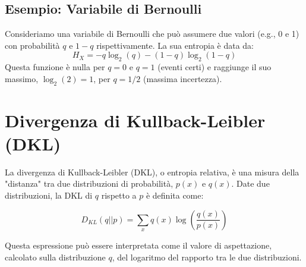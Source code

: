 \subsection*{Esempio: Variabile di Bernoulli}
Consideriamo una variabile di Bernoulli che può assumere due valori (e.g., 0 e 1) con probabilità $q$ e $1-q$ rispettivamente. La sua entropia è data da:
\begin{equation}
 H_X = -q \log_2(q) - (1-q) \log_2(1-q)
\end{equation}
Questa funzione è nulla per $q=0$ e $q=1$ (eventi certi) e raggiunge il suo massimo, $\log_2(2)=1$, per $q=1/2$ (massima incertezza).

\newpage
\section{Divergenza di Kullback-Leibler (DKL)}

La divergenza di Kullback-Leibler (DKL), o entropia relativa, è una misura della "distanza" tra due distribuzioni di probabilità, $p(x)$ e $q(x)$. Date due distribuzioni, la DKL di $q$ rispetto a $p$ è definita come:

\begin{tcolorbox}[colback=yellow!30,  
                  colframe=yellow!50!orange,  
                  boxrule=0.8pt, 
                  arc=3pt,  
                  top=4pt, bottom=4pt, left=6pt, right=6pt,
                  enhanced,
                  sharp corners=south]
\begin{equation}
 D_{KL}(q || p) = \sum_x q(x) \log\left(\frac{q(x)}{p(x)}\right)
\end{equation}
\end{tcolorbox}


Questa espressione può essere interpretata come il valore di aspettazione, calcolato sulla distribuzione $q$, del logaritmo del rapporto tra le due distribuzioni.

